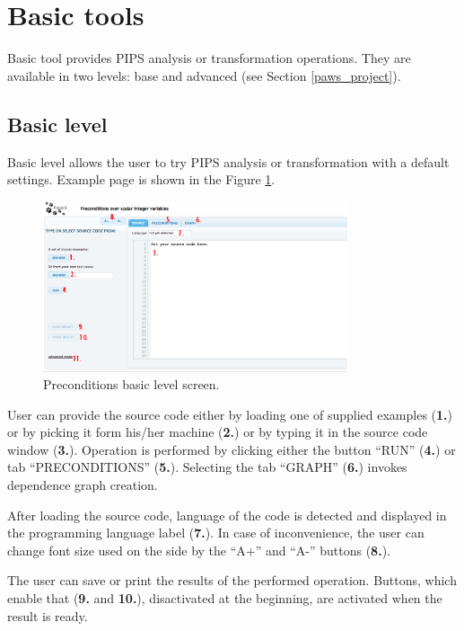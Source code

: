 \section{Basic tools}

Basic tool provides PIPS analysis or transformation operations. They are available in two levels: base and advanced (see Section \ref{paws_project}).

\subsection{Basic level}

Basic level allows the user to try PIPS analysis or transformation with a default settings. Example page is shown in the Figure \ref{fig:basic_mode_screen}.

\begin{figure}[h!]
  \centering
  \includegraphics[width=0.8\textwidth]{reportCh4/basic_mode_screen}
  \caption{Preconditions basic level screen.}
  \label{fig:basic_mode_screen}
\end{figure}

User can provide the source code either by loading one of supplied examples ({\bf 1.}) or by picking it form his/her machine ({\bf 2.}) or by typing it in the source code window ({\bf 3.}). Operation is performed by clicking either the button ``RUN'' ({\bf 4.}) or tab ``PRECONDITIONS'' ({\bf 5.}). Selecting the tab ``GRAPH'' ({\bf 6.}) invokes dependence graph creation.

After loading the source code, language of the code is detected and displayed in the programming language label ({\bf 7.}). In case of inconvenience, the user can change font size used on the side by the ``A+'' and ``A-'' buttons ({\bf 8.}).

The user can save or print the results of the performed operation. Buttons, which enable that ({\bf 9.} and {\bf 10.}), disactivated at the beginning, are activated when the result is ready.

